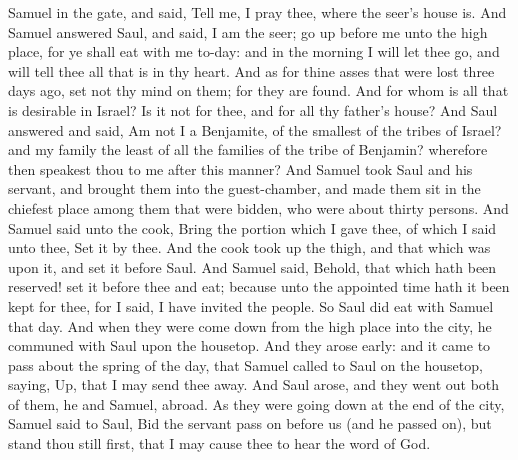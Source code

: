 Samuel in the gate, and said, Tell me, I pray thee, where the seer’s house is. And Samuel answered Saul, and said, I am the seer; go up before me unto the high place, for ye shall eat with me to-day: and in the morning I will let thee go, and will tell thee all that is in thy heart. And as for thine asses that were lost three days ago, set not thy mind on them; for they are found. And for whom is all that is desirable in Israel? Is it not for thee, and for all thy father’s house? And Saul answered and said, Am not I a Benjamite, of the smallest of the tribes of Israel? and my family the least of all the families of the tribe of Benjamin? wherefore then speakest thou to me after this manner?  And Samuel took Saul and his servant, and brought them into the guest-chamber, and made them sit in the chiefest place among them that were bidden, who were about thirty persons. And Samuel said unto the cook, Bring the portion which I gave thee, of which I said unto thee, Set it by thee. And the cook took up the thigh, and that which was upon it, and set it before Saul. And Samuel said, Behold, that which hath been reserved! set it before thee and eat; because unto the appointed time hath it been kept for thee, for I said, I have invited the people. So Saul did eat with Samuel that day.  And when they were come down from the high place into the city, he communed with Saul upon the housetop. And they arose early: and it came to pass about the spring of the day, that Samuel called to Saul on the housetop, saying, Up, that I may send thee away. And Saul arose, and they went out both of them, he and Samuel, abroad. As they were going down at the end of the city, Samuel said to Saul, Bid the servant pass on before us (and he passed on), but stand thou still first, that I may cause thee to hear the word of God. 

